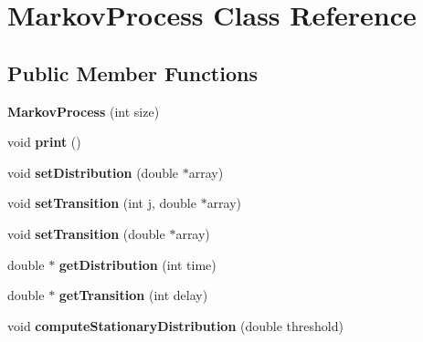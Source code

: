 \hypertarget{class_markov_process}{}\section{Markov\+Process Class Reference}
\label{class_markov_process}
\subsection*{Public Member Functions}
\begin{DoxyCompactItemize}
\item 
\hypertarget{class_markov_process_a6dbcf0cf4a855b803c57d3e69bb42a7d}{}{\bfseries Markov\+Process} (int size)\label{class_markov_process_a6dbcf0cf4a855b803c57d3e69bb42a7d}

\item 
\hypertarget{class_markov_process_acee38f7c8f384f9be422c965a0efc4fb}{}void {\bfseries print} ()\label{class_markov_process_acee38f7c8f384f9be422c965a0efc4fb}

\item 
\hypertarget{class_markov_process_a2942db4262f73c20cc49bfebaf0df101}{}void {\bfseries set\+Distribution} (double $\ast$array)\label{class_markov_process_a2942db4262f73c20cc49bfebaf0df101}

\item 
\hypertarget{class_markov_process_a1dfca569e38a94214afc152c5b0c2567}{}void {\bfseries set\+Transition} (int j, double $\ast$array)\label{class_markov_process_a1dfca569e38a94214afc152c5b0c2567}

\item 
\hypertarget{class_markov_process_a687c9c983ac090f2ba40d028c6f04786}{}void {\bfseries set\+Transition} (double $\ast$array)\label{class_markov_process_a687c9c983ac090f2ba40d028c6f04786}

\item 
\hypertarget{class_markov_process_afa7edaa775112df8dd4fc5007034d7e7}{}double $\ast$ {\bfseries get\+Distribution} (int time)\label{class_markov_process_afa7edaa775112df8dd4fc5007034d7e7}

\item 
\hypertarget{class_markov_process_a39c87840da9b238d7c33bd5ad23d538d}{}double $\ast$ {\bfseries get\+Transition} (int delay)\label{class_markov_process_a39c87840da9b238d7c33bd5ad23d538d}

\item 
\hypertarget{class_markov_process_a77be24a3ccec6e19ba922f932d19e0fa}{}void {\bfseries compute\+Stationary\+Distribution} (double threshold)\label{class_markov_process_a77be24a3ccec6e19ba922f932d19e0fa}


\end{DoxyCompactItemize}
